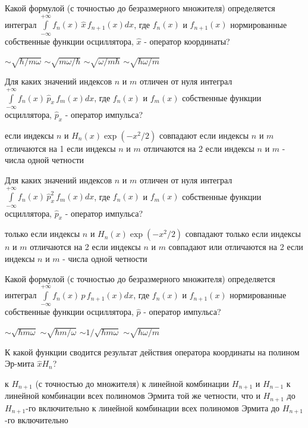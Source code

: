 \documentclass[11pt,a4paper]{exam}
\begin{document}
\begin{questions}
\question Какой формулой (с точностью до безразмерного множителя) определяется интеграл $\int\limits_{-\infty }^{+\infty }{{{f}_{n}}(x)\,\hat{x}\,{{f}_{n+1}}(x)dx}$, где ${{f}_{n}}(x)$ и ${{f}_{n+1}}(x)$ нормированные собственные функции осциллятора, $\hat{x}$ - оператор координаты?
\begin{choices}
\choice $\sim \sqrt{\hbar /m\omega }$    
\choice $\sim \sqrt{m\omega /\hbar }$    
\choice $\sim \sqrt{\omega /m\hbar }$    
\choice $\sim \sqrt{\hbar \omega /m}$
\end{choices}

\question Для каких значений индексов $n$ и $m$ отличен от нуля интеграл $\int\limits_{-\infty }^{+\infty }{{{f}_{n}}(x)\,{{{\hat{p}}}_{x}}\,{{f}_{m}}(x)dx}$, где ${{f}_{n}}(x)$ и ${{f}_{m}}(x)$ собственные функции осциллятора, ${{\hat{p}}_{x}}$ - оператор импульса?
\begin{choices}
\choice если индексы $n$ и ${{H}_{n}}(x)\exp \left( -{{x}^{2}}/2 \right)$ совпадают
\choice если индексы $n$ и $m$ отличаются на 1
\choice если индексы $n$ и $m$ отличаются на 2
\choice если индексы $n$ и $m$ - числа одной четности
\end{choices}

\question Для каких значений индексов $n$ и $m$ отличен от нуля интеграл $\int\limits_{-\infty }^{+\infty }{{{f}_{n}}(x)\,\hat{p}_{x}^{2}\,{{f}_{m}}(x)dx}$, где ${{f}_{n}}(x)$ и ${{f}_{m}}(x)$ собственные функции осциллятора, ${{\hat{p}}_{x}}$ - оператор импульса?
\begin{choices}
\choice только если индексы $n$ и ${{H}_{n}}(x)\exp \left( -{{x}^{2}}/2 \right)$ совпадают
\choice только если индексы $n$ и $m$ отличаются на 2
\choice если индексы $n$ и $m$ совпадают или отличаются на 2
\choice если индексы $n$ и $m$ - числа одной четности
\end{choices}

\question Какой формулой (с точностью до безразмерного множителя) определяется интеграл $\int\limits_{-\infty }^{+\infty }{{{f}_{n}}(x)\,\hat{p}\,{{f}_{n+1}}(x)dx}$, где ${{f}_{n}}(x)$ и ${{f}_{n+1}}(x)$ нормированные собственные функции осциллятора, $\hat{p}$ - оператор импульса?
\begin{choices}
\choice $\sim \sqrt{\hbar m\omega }$        
\choice $\sim \sqrt{\hbar m/\omega }$       
\choice $\sim 1/\sqrt{\hbar m\omega }$           
\choice $\sim \sqrt{\hbar \omega /m}$
\end{choices}

\question К какой функции сводится результат действия оператора координаты на полином Эр-мита $\hat{x}{{H}_{n}}$? 
\begin{choices}
\choice к ${{H}_{n+1}}$ (с точностью до множителя)
\choice к линейной комбинации ${{H}_{n+1}}$ и ${{H}_{n-1}}$
\choice к линейной комбинации всех полиномов Эрмита той же четности, что и ${{H}_{n+1}}$ до ${{H}_{n+1}}$-го включительно
\choice к линейной комбинации всех полиномов Эрмита до ${{H}_{n+1}}$-го включительно
\end{choices}


\end{questions}
\end{document}
